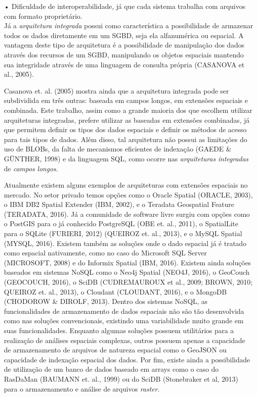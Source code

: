 			•	Dificuldade de interoperabilidade, já que cada sistema trabalha
						com arquivos com formato proprietário. \\
						
		
		Já a \textit{arquitetura integrada} possui como característica a possibilidade de armazenar todos os dados diretamente em um SGBD, seja ela alfanumérica ou espacial. A vantagem deste tipo de arquitetura é a possibilidade de manipulação dos dados através dos recursos de um SGBD, manipulando os objetos espaciais mantendo sua integridade através de uma linguagem de consulta própria (CASANOVA et al., 2005)\cite{CASANOVA_etal05}.
		
		Casanova et. al. (2005) mostra ainda que a arquitetura integrada pode ser subdividida em três outras: baseada em campos longos, em extensões espaciais e combinada. Este trabalho, assim como a grande maioria dos que escolhem utilizar arquiteturas integradas, prefere utilizar as baseadas em extensões combinadas, já que permitem definir os tipos dos dados espaciais e definir os métodos de acesso para tais tipos de dados. Além disso, tal arquitetura não possui as limitações do uso de BLOBs, da falta de mecanismos eficientes de indexação (GAEDE \& GÜNTHER, 1998)\cite{GAEDE_GUNTHER} e da linguagem SQL, como ocorre nas \textit{arquiteturas integradas} de \textit{campos longos}.
		
		Atualmente existem alguns exemplos de arquiteturas com extensões espaciais no mercado. No setor privado temos opções como o Oracle Spatial (ORACLE, 2003), o IBM DB2 Spatial Extender (IBM, 2002)\cite{IBM_02}, e o Teradata Geospatial Feature (TERADATA, 2016)\cite{TERADATA}. Já a comunidade de software livre surgiu com opções como o PostGIS para o já conhecido PostgreSQL (OBE et. al., 2011)\cite{OBE_etal11}, o SpatialLite para o SQLite (FURIERI, 2012)\cite{FURIERI} (QUEIROZ et. al., 2013)\cite{QUEIROZ_etal13}, e o MySQL Spatial (MYSQL, 2016)\cite{MYSQL}. Existem também as soluções onde o dado espacial já é tratado como espacial nativamente, como no caso do Microsoft SQL Server (MICROSOFT, 2008)\cite{MICROSOFT} e do Informix Spatial (IBM, 2016)\cite{IBM_16}. Existem ainda soluções baseados em sistemas NoSQL como o Neo4j Spatial (NEO4J, 2016), o GeoCouch (GEOCOUCH, 2016), o SciDB (CUDREMAUROUX et al., 2009\cite{CUDRE-MAUROUX_etal09}; BROWN, 2010\cite{BROWN}; QUEIROZ et. al., 2013\cite{QUEIROZ_etal13}), o Cloudant (CLOUDANT, 2016), e o MongoDB (CHODOROW \& DIROLF, 2013)\cite{CHODOROW_DIROLF}. Dentro dos sistemas NoSQL, as funcionalidades de armazenamento de dados espaciais não são tão desenvolvida como nas soluções convencionais, existindo uma variabilidade muito grande em suas funcionalidades. Enquanto algumas soluções possuem utilitários para a realização de análises espaciais complexas, outros possuem apenas a capacidade de armazenamento de arquivos de natureza espacial como o GeoJSON ou capacidade de indexação espacial dos dados. Por fim, existe ainda a possibilidade de utilização de um banco de dados baseado em arrays como o caso do RasDaMan (BAUMANN et. al., 1999)\cite{BAUMANN_etal99} ou do SciDB (Stonebraker et al, 2013)\cite{STONEBRAKER_etal13} para o armazenamento e análise de arquivos\textit{ raster}.
		
